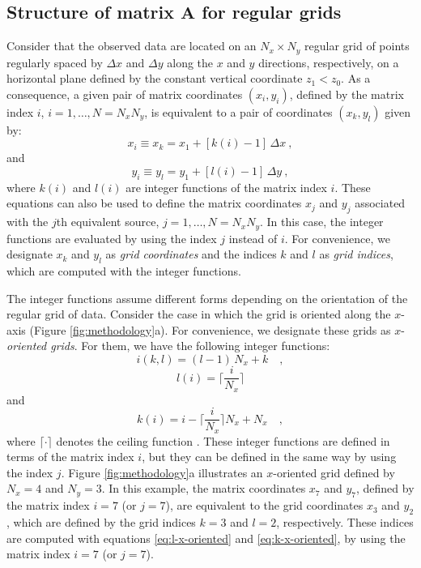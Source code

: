 \subsection{Structure of matrix $\mathbf{A}$ for regular grids}

Consider that the observed data are located on an $N_{x} \times N_{y}$ regular grid of
points regularly spaced by $\Delta x$ and $\Delta y$ along the $x$ and $y$ directions,
respectively, on a horizontal plane defined by the constant vertical coordinate $z_{1} < z_{0}$. 
As a consequence, a given pair of matrix coordinates $(x_{i}, y_{i})$, defined by the matrix index 
$i$, $i = 1, \dots, N = N_{x} N_{y}$, is equivalent to a pair of coordinates $(x_{k}, y_{l})$
given by:
\begin{equation}
x_{i} \equiv x_{k} = x_{1} + \left[ k(i) - 1 \right] \, \Delta x \: , 
\label{eq:xi}
\end{equation}
and
\begin{equation}
y_{i} \equiv y_{l} = y_{1} + \left[ l(i) - 1 \right] \, \Delta y \: ,
\label{eq:yi}
\end{equation}
where $k(i)$ and $l(i)$ are integer functions of the matrix index $i$.
These equations can also be used to define the matrix coordinates 
$x_{j}$ and $y_{j}$ associated with the $j$th equivalent source,
$j = 1, \dots, N = N_{x}N_{y}$. In this case, the integer functions
are evaluated by using the index $j$ instead of $i$.
For convenience, we designate $x_{k}$ and $y_{l}$ as \textit{grid coordinates}
and the indices $k$ and $l$ as \textit{grid indices}, which are computed with
the integer functions.

The integer functions assume different forms depending on the 
orientation of the regular grid of data.
Consider the case in which the grid is oriented along the
$x$-axis (Figure \ref{fig:methodology}a). For convenience, we designate these grids as 
$x$-\textit{oriented grids}. For them, we have the following integer functions:
\begin{equation}
i(k, l) = (l - 1) \, N_{x} + k \quad ,
\label{eq:i-x-oriented}
\end{equation}
\begin{equation}
l(i) = \Bigg\lceil \frac{i}{N_{x}} \Bigg\rceil
\label{eq:l-x-oriented}
\end{equation}
and
\begin{equation}
k(i)  = i - \Bigg\lceil \frac{i}{N_{x}} \Bigg\rceil N_{x} + N_{x} \quad ,
\label{eq:k-x-oriented}
\end{equation}
where $\lceil \cdot \rceil$ denotes the ceiling function \citep[][ p. 67]{graham-etal1994}.
These integer functions are defined in terms of the matrix index $i$, but they can 
be defined in the same way by using the index $j$.
Figure \ref{fig:methodology}a illustrates an $x$-oriented grid defined by $N_{x} = 4$ and $N_{y} = 3$.
In this example, the matrix coordinates $x_{7}$ and $y_{7}$, defined by the matrix index $i = 7$ (or $j = 7$), 
are equivalent to the grid coordinates $x_{3}$ and $y_{2}$, which are defined by the grid indices
$k = 3$ and $l = 2$, respectively. These indices are computed with equations \ref{eq:l-x-oriented}
and \ref{eq:k-x-oriented}, by using the matrix index $i = 7$ (or $j = 7$).

